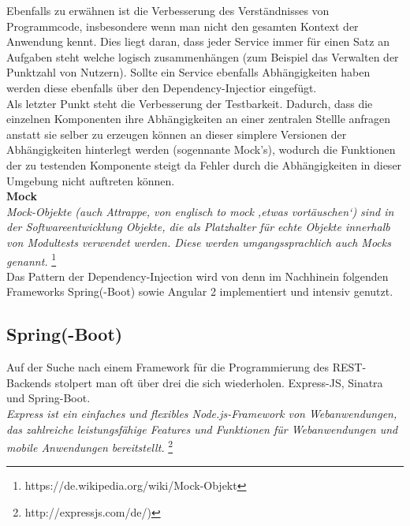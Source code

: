 Ebenfalls zu erwähnen ist die Verbesserung des Verständnisses von Programmcode, insbesondere wenn man nicht den gesamten Kontext der Anwendung kennt. Dies liegt daran, dass jeder Service immer für einen Satz an Aufgaben steht welche logisch zusammenhängen (zum Beispiel das Verwalten der Punktzahl von Nutzern). Sollte ein Service ebenfalls Abhängigkeiten haben werden diese ebenfalls über den Dependency-Injectior eingefügt. \\

Als letzter Punkt steht die Verbesserung der Testbarkeit. Dadurch, dass die einzelnen Komponenten ihre Abhängigkeiten an einer zentralen Stellle anfragen anstatt sie selber zu erzeugen können an dieser simplere Versionen der Abhängigkeiten hinterlegt werden (sogennante Mock's), wodurch die Funktionen der zu testenden Komponente steigt da Fehler durch die Abhängigkeiten in dieser Umgebung nicht auftreten können. \\

\textbf{Mock} \\
\emph{\glqq   
Mock-Objekte (auch Attrappe, von englisch to mock ‚etwas vortäuschen‘) sind in der Softwareentwicklung Objekte, die als Platzhalter für echte Objekte innerhalb von Modultests verwendet werden. Diese werden umgangssprachlich auch Mocks genannt.
\grqq} \footnote{https://de.wikipedia.org/wiki/Mock-Objekt} \\

Das Pattern der Dependency-Injection wird von denn im Nachhinein folgenden Frameworks Spring(-Boot) sowie Angular 2 implementiert und intensiv genutzt.





\subsection{Spring(-Boot)}


Auf der Suche nach einem Framework für die Programmierung des REST-Backends stolpert man oft über drei die sich wiederholen. Express-JS, Sinatra und Spring-Boot. \\


\emph{\glqq   
Express ist ein einfaches und flexibles Node.js-Framework von Webanwendungen, das zahlreiche leistungsfähige Features und Funktionen für Webanwendungen und mobile Anwendungen bereitstellt.
\grqq} \footnote{http://expressjs.com/de/)} \\


